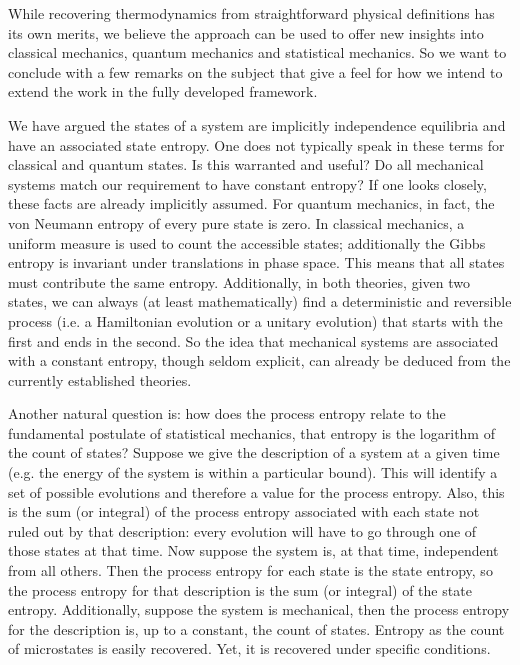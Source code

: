 \documentclass[letterpaper,twocolumn]{article}
\begin{document}
While recovering thermodynamics from straightforward physical definitions has its own merits, we believe the approach can be used to offer new insights into classical mechanics, quantum mechanics and statistical mechanics. So we want to conclude with a few remarks on the subject that give a feel for how we intend to extend the work in the fully developed framework.

We have argued the states of a system are implicitly independence equilibria and have an associated state entropy. One does not typically speak in these terms for classical and quantum states. Is this warranted and useful? Do all mechanical systems match our requirement to have constant entropy? If one looks closely, these facts are already implicitly assumed. For quantum mechanics, in fact, the von Neumann entropy of every pure state is zero. In classical mechanics, a uniform measure is used to count the accessible states; additionally the Gibbs entropy is invariant under translations in phase space. This means that all states must contribute the same entropy. Additionally, in both theories, given two states, we can always (at least mathematically) find a deterministic and reversible process (i.e. a Hamiltonian evolution or a unitary evolution) that starts with the first and ends in the second. So the idea that mechanical systems are associated with a constant entropy, though seldom explicit, can already be deduced from the currently established theories.

Another natural question is: how does the process entropy relate to the fundamental postulate of statistical mechanics, that entropy is the logarithm of the count of states?
Suppose we give the description of a system at a given time (e.g. the energy of the system is within a particular bound). This will identify a set of possible evolutions and therefore a value for the process entropy. Also, this is the sum (or integral) of the process entropy associated with each state not ruled out by that description: every evolution will have to go through one of those states at that time. Now suppose the system is, at that time, independent from all others. Then the process entropy for each state is the state entropy, so the process entropy for that description is the sum (or integral) of the state entropy. Additionally, suppose the system is mechanical, then the process entropy for the description is, up to a constant, the count of states. Entropy as the count of microstates is easily recovered. Yet, it is recovered under specific conditions.
\end{document}
